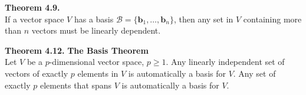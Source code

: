 \documentclass[10pt]{book}
\newcommand{\boxcolor}{gray!30}
\newenvironment{boxthm}{\begin{mdframed}[backgroundcolor=\boxcolor,nobreak=true]}{\end{mdframed}}
\theoremstyle{definition}
\newtheorem{exercise}{Exercise}[section]
\newcommand{\B}{\mathscr{B}}
\newcommand{\vect}[1]{\ensuremath{\boldsymbol{\mathbf{#1}}}}
\newcommand{\vectset}[3][v]{\{\vect{#1}_{#2},\ldots,\vect{#1}_{#3}\}}
\begin{document}
\newpage



\begin{boxthm}
	\textbf{Theorem 4.9.} \\
	If a vector space $V$ has a basis $\B=\vectset[b]{1}{n}$, then any set in $V$ containing more than $n$ vectors must be linearly dependent.
\end{boxthm}
\vspace{-1em}
\begin{boxthm}
	\textbf{Theorem 4.12.}
	\textbf{The Basis Theorem} \\
	Let $V$ be a $p$-dimensional vector space, $p\geq 1$. Any linearly independent set of vectors of exactly $p$ elements in $V$ is automatically a basis for $V$. Any set of exactly $p$ elements that spans $V$ is automatically a basis for $V$.
\end{boxthm}
\end{document}
